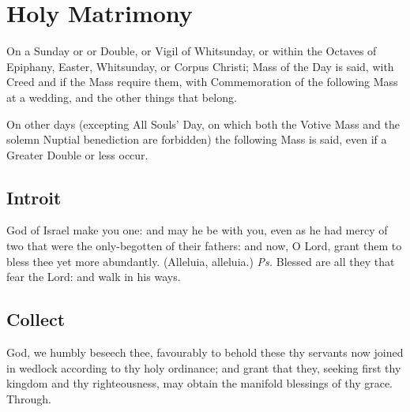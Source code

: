\clearpage

\section{Holy Matrimony}\label{MatrimonyMass}
\fancyhead[RE,LO]{}
\begin{secrubric}
    On a Sunday or  or  Double, or Vigil of Whitsunday, or within the Octaves of Epiphany, Easter, Whitsunday, or Corpus Christi; Mass of the Day is said, with Creed and  if the Mass require them, with Commemoration of the following Mass at a wedding, and the other things that belong.\par
    On other days (excepting All Souls' Day, on which both the Votive Mass and the solemn Nuptial benediction are forbidden) the following Mass is said, even if a Greater Double or less occur.
\end{secrubric}

\subsection{Introit}
 God of Israel make you one: and may he be with you, even as he had mercy of two that were the only-begotten of their fathers: and now, O Lord, grant them to bless thee yet more abundantly. (Alleluia, alleluia.) \textit{Ps.} Blessed are all they that fear the Lord: and walk in his ways.

\subsection{Collect}
 God, we humbly beseech thee, favourably to behold these thy servants now joined in wedlock according to thy holy ordinance; and grant that they, seeking first thy kingdom and thy righteousness, may obtain the manifold blessings of thy grace. Through.
 
